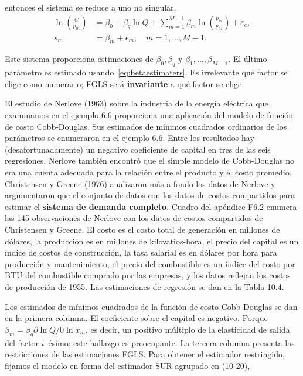 entonces el sistema se reduce a uno no singular,
\begin{align*}
\ln\left(\frac{C}{p_{m}}\right)
&=\beta_{0}+\beta_{q}\ln Q + \sum_{m=1}^{M-1}\beta_{m}\ln\left(\frac{p_{m}}{p_{M}}\right)+\varepsilon_{c},\\
s_{m}
&=\beta_{m} + \epsilon_{m},\quad m=1,\ldots, M-1.
\end{align*}

Este sistema proporciona estimaciones de $\beta_{0}, \beta_{q}$ y $\beta_{1},\ldots,\beta_{M- 1}$. El último parámetro es estimado usando~\eqref{eq:betaestimaters}. Es irrelevante qué factor se elige como numerario; FGLS será \textbf{invariante} a qué factor se elige.

\begin{example}
El estudio de Nerlove (1963) sobre la industria de la energía eléctrica que examinamos en el ejemplo 6.6 proporciona una aplicación del modelo de función de costo Cobb-Douglas. Sus estimados de mínimos cuadrados ordinarios de los parámetros se enumeraron en el ejemplo 6.6. Entre los resultados hay (desafortunadamente) un negativo coeficiente de capital en tres de las seis regresiones. Nerlove también encontró que el simple modelo de Cobb-Douglas no era una cuenta adecuada para la relación entre el producto y el costo promedio. Christensen y Greene (1976) analizaron más a fondo los datos de Nerlove y argumentaron que el conjunto de datos con los datos de costos compartidos para estimar el \textbf{sistema de demanda completo}. Cuadro del apéndice F6.2 enumera las 145 observaciones de Nerlove con los datos de costos compartidos de Christensen y Greene. El costo es el costo total de generación en millones de dólares, la producción es en millones de kilovatios-hora, el precio del capital es un índice de costos de construcción, la tasa salarial es en dólares por hora para producción y mantenimiento, el precio del combustible es un índice del costo por BTU del combustible comprado por las empresas, y los datos reflejan los costos de producción de 1955. Las estimaciones de regresión se dan en la Tabla 10.4.

Los estimados de mínimos cuadrados de la función de costo Cobb-Douglas se dan en la primera columna. El coeficiente sobre el capital es negativo. Porque $\beta_{m}=\beta_{q}\partial\ln Q/0\ln x_{m}$, es decir, un positivo múltiplo de la elasticidad de salida del factor $i$--ésimo; este hallazgo es preocupante. La tercera columna presenta las restricciones de las estimaciones FGLS. Para obtener el estimador restringido, fijamos el modelo en forma del estimador SUR agrupado en (10-20),
\end{example}
